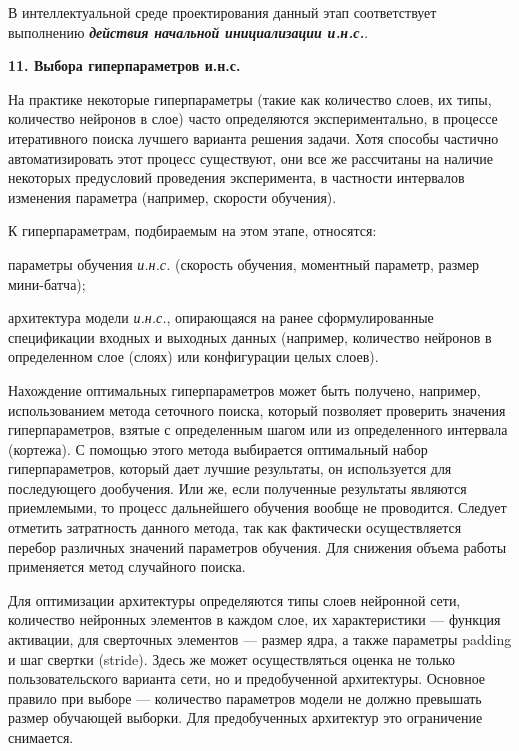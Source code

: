 В интеллектуальной среде проектирования данный этап соответствует выполнению \textbf{\textit{действия начальной инициализации и.н.с.}}.


\textbf{11. Выбора гиперпараметров и.н.с.}

На практике некоторые гиперпараметры (такие как количество слоев, их типы, количество нейронов в слое) часто определяются экспериментально, в процессе итеративного поиска лучшего варианта решения задачи. Хотя способы частично автоматизировать этот процесс существуют, они все же рассчитаны на наличие некоторых предусловий проведения эксперимента, в частности интервалов изменения параметра (например, скорости обучения).

К гиперпараметрам, подбираемым на этом этапе, относятся:
\begin{textitemize}
	\item параметры обучения \textit{и.н.с.} (скорость обучения, моментный параметр, размер мини-батча);
	\item архитектура модели \textit{и.н.с.}, опирающаяся на ранее сформулированные спецификации входных и выходных данных (например, количество нейронов в определенном слое (слоях) или конфигурации целых слоев).
\end{textitemize}

Нахождение оптимальных гиперпараметров может быть получено, например, использованием метода сеточного поиска, который позволяет проверить значения гиперпараметров, взятые с определенным шагом или из определенного интервала (кортежа). С помощью этого метода выбирается оптимальный набор гиперпараметров, который дает лучшие результаты, он используется для последующего дообучения. Или же, если полученные результаты являются приемлемыми, то процесс дальнейшего обучения вообще не проводится. Следует отметить затратность данного метода, так как фактически осуществляется перебор различных значений параметров обучения. Для снижения объема работы применяется метод случайного поиска.

Для оптимизации архитектуры определяются типы слоев нейронной сети, количество нейронных элементов в каждом слое, их характеристики --- функция активации, для сверточных элементов --- размер ядра, а также параметры padding и шаг свертки (stride).
Здесь же может осуществляться оценка не только пользовательского варианта сети, но и предобученной архитектуры. Основное правило при выборе --- количество параметров модели не должно превышать размер обучающей выборки. Для предобученных архитектур это ограничение снимается.

